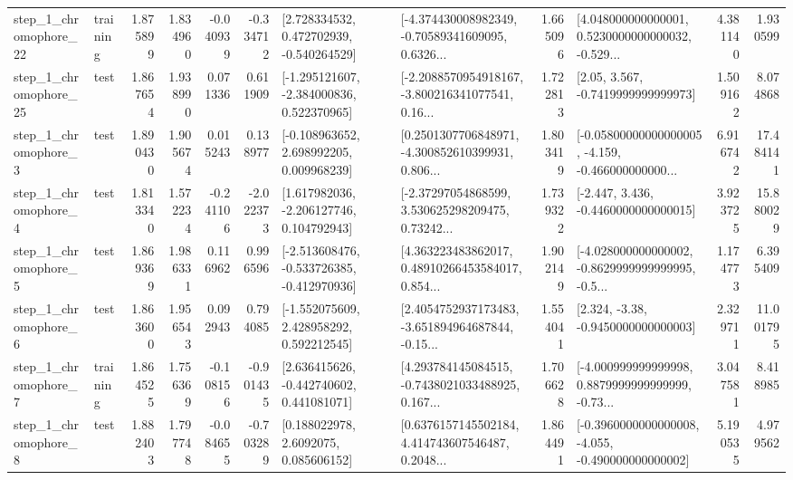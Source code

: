 \begin{tabular}{llrrrrllrlrr}
    step\_1\_chromophore\_22 &  training &      1.875899 &    1.834960 &     -0.040939 & -0.334712 &    [2.728334532, 0.472702939, -0.540264529] &  [-4.374430008982349, -0.70589341609095, 0.6326... &       1.665096 &  [4.048000000000001, 0.5230000000000032, -0.529... &            4.381140 &          1.930599 \\
    step\_1\_chromophore\_25 &      test &      1.867654 &    1.938990 &      0.071336 &  0.611909 &   [-1.295121607, -2.384000836, 0.522370965] &  [-2.2088570954918167, -3.800216341077541, 0.16... &       1.722813 &                 [2.05, 3.567, -0.7419999999999973] &            1.509162 &          8.074868 \\
     step\_1\_chromophore\_3 &      test &      1.890430 &    1.905674 &      0.015243 &  0.138977 &    [-0.108963652, 2.698992205, 0.009968239] &  [0.2501307706848971, -4.300852610399931, 0.806... &       1.803419 &  [-0.05800000000000005, -4.159, -0.466000000000... &            6.916742 &         17.484141 \\
     step\_1\_chromophore\_4 &      test &      1.813340 &    1.572234 &     -0.241106 & -2.022373 &    [1.617982036, -2.206127746, 0.104792943] &  [-2.37297054868599, 3.530625298209475, 0.73242... &       1.739322 &               [-2.447, 3.436, -0.4460000000000015] &            3.923725 &         15.880029 \\
     step\_1\_chromophore\_5 &      test &      1.869369 &    1.986331 &      0.116962 &  0.996596 &  [-2.513608476, -0.533726385, -0.412970936] &  [4.363223483862017, 0.48910266453584017, 0.854... &       1.902149 &  [-4.028000000000002, -0.8629999999999995, -0.5... &            1.174773 &          6.395409 \\
     step\_1\_chromophore\_6 &      test &      1.863600 &    1.956543 &      0.092943 &  0.794085 &    [-1.552075609, 2.428958292, 0.592212545] &  [2.4054752937173483, -3.651894964687844, -0.15... &       1.554041 &                [2.324, -3.38, -0.9450000000000003] &            2.329711 &         11.001795 \\
     step\_1\_chromophore\_7 &  training &      1.864525 &    1.756369 &     -0.108156 & -0.901435 &    [2.636415626, -0.442740602, 0.441081071] &  [4.293784145084515, -0.7438021033488925, 0.167... &       1.706628 &  [-4.000999999999998, 0.8879999999999999, -0.73... &            3.047581 &          8.418985 \\
     step\_1\_chromophore\_8 &      test &      1.882403 &    1.797748 &     -0.084655 & -0.703289 &       [0.188022978, 2.6092075, 0.085606152] &  [0.6376157145502184, 4.414743607546487, 0.2048... &       1.864491 &  [-0.3960000000000008, -4.055, -0.490000000000002] &            5.190535 &          4.979562 \\

\end{tabular}
